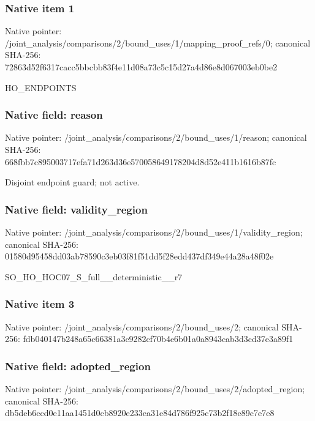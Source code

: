 \documentclass[10pt,a4paper]{article}
\begin{document}
\subsubsection{Native item 1}
Native pointer: /joint\_\allowbreak{}analysis/comparisons/2/bound\_\allowbreak{}uses/1/mapping\_\allowbreak{}proof\_\allowbreak{}refs/0; canonical SHA-256: 72863d52f6317cacc5bbcbb83f4e11d08a73c5c15d27a4d86e8d067003eb0be2

\begingroup\raggedright\sloppy HO\_\allowbreak{}ENDPOINTS\par\endgroup

\subsubsection{Native field: reason}
Native pointer: /joint\_\allowbreak{}analysis/comparisons/2/bound\_\allowbreak{}uses/1/reason; canonical SHA-256: 668fbb7c895003717efa71d263d36e570058649178204d8d52e411b1616b87fc

\begingroup\raggedright\sloppy Disjoint endpoint guard;\allowbreak{} not active.\par\endgroup

\subsubsection{Native field: validity\_\allowbreak{}region}
Native pointer: /joint\_\allowbreak{}analysis/comparisons/2/bound\_\allowbreak{}uses/1/validity\_\allowbreak{}region; canonical SHA-256: 01580d95458dd03ab78590c3eb03f81f51dd5f28edd437df349e44a28a48f02e

\begingroup\raggedright\sloppy SO\_\allowbreak{}HO\_\allowbreak{}HOC07\_\allowbreak{}S\_\allowbreak{}full\_\allowbreak{}\_\allowbreak{}deterministic\_\allowbreak{}\_\allowbreak{}r7\par\endgroup

\subsubsection{Native item 3}
Native pointer: /joint\_\allowbreak{}analysis/comparisons/2/bound\_\allowbreak{}uses/2; canonical SHA-256: fdb040147b248a65c66381a3c9282cf70b4e6b01a0a8943cab3d3cd37e3a89f1

\subsubsection{Native field: adopted\_\allowbreak{}region}
Native pointer: /joint\_\allowbreak{}analysis/comparisons/2/bound\_\allowbreak{}uses/2/adopted\_\allowbreak{}region; canonical SHA-256: db5deb6ccd0e11aa1451d0cb8920e233ea31e84d786f925c73b2f18e89c7e7e8
\end{document}
